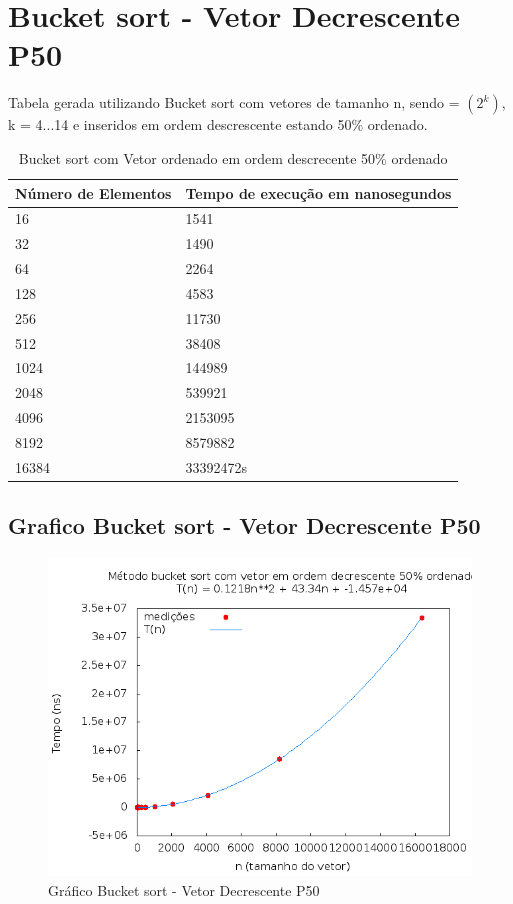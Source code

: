 \documentclass[12pt,a4paper,twoside]{report}
\begin{document}
\section{Bucket sort - Vetor Decrescente P50}
Tabela gerada utilizando Bucket sort com vetores de tamanho n, sendo = $(2^k)$, k = 4...14 e inseridos em ordem descrescente estando 50\% ordenado.

\begin{table}[H]
\centering
\caption{Bucket sort com Vetor ordenado em ordem descrecente 50\% ordenado}
\label{my-label}
\begin{tabular}{|l|l|}
\hline
\multicolumn{1}{|c|}{\textbf{Número de Elementos}} & \multicolumn{1}{c|}{\textbf{Tempo de execução em nanosegundos}} \\ \hline
16 & 1541 \\ \hline
32 & 1490 \\ \hline
64 & 2264 \\ \hline
128 & 4583 \\ \hline
256 & 11730 \\ \hline
512 & 38408 \\ \hline
1024 & 144989 \\ \hline
2048 & 539921 \\ \hline
4096 & 2153095 \\ \hline
8192 & 8579882 \\ \hline
16384 & 33392472s \\ \hline
\end{tabular}
\end{table}

\subsection{Grafico Bucket sort - Vetor Decrescente P50}
\begin{figure}[H]
    \centering
    \includegraphics[width=0.7\linewidth]{graficos/Bucket/vIntDecrescenteP50/vIntDecrescenteP50.png}
  \caption{Gráfico Bucket sort - Vetor Decrescente P50}
\end{figure}
\end{document}
